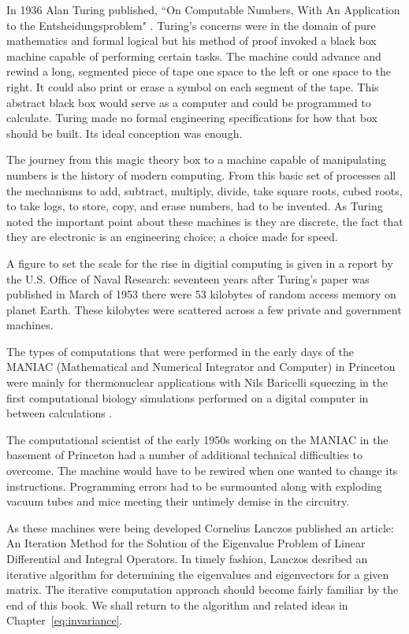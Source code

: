 In 1936 Alan Turing published, ``On Computable Numbers, 
With An Application to the Entsheidungsproblem"
\cite{turing36a}. Turing's concerns were in the domain of pure mathematics and
formal logical but his method of proof invoked a black box machine capable of performing
certain tasks. The machine could advance and rewind a long,
segmented piece of tape one space to the left or one space to the right. 
It could also print or erase a symbol on each segment of the tape.
This abstract black box would serve as a computer and could be programmed 
to calculate. Turing made no formal engineering
specifications for how that box should be built. 
Its ideal conception was enough.

The journey from this magic theory box to a machine capable of manipulating
numbers is the history of modern computing. From this basic set of processes
all the mechanisms to add, subtract, multiply, divide, take square roots, cubed roots, to take logs,
to store, copy, and erase numbers, had to be invented. As Turing noted the important point about
these machines is they are discrete, the fact that they are electronic
is an engineering choice; a choice made for speed.

A figure to set the scale for the rise in digitial computing is given in a report
by the U.S. Office of Naval Research: seventeen years after Turing's paper 
was published in March of 1953 there were 53 kilobytes of 
random access memory on planet Earth.\cite{usonr53}
These kilobytes were scattered across a few private and government machines. 

The types of computations that were performed in the early days of the MANIAC 
(Mathematical and Numerical Integrator and Computer) in Princeton
were mainly for thermonuclear applications with Nils Baricelli 
squeezing in the first computational biology simulations 
performed on a digital computer in between calculations \cite{dyson12, barricelli54, barricelli62}.

The computational scientist of the early 1950s working
on the MANIAC in the basement of Princeton had a number of additional 
technical difficulties to overcome. The machine would have to be rewired when one wanted
to change its instructions. Programming errors had to be surmounted along with exploding
vacuum tubes and mice meeting their untimely demise in the circuitry.

As these machines were being developed Cornelius Lanczos published
an article: An Iteration Method for the Solution of the Eigenvalue Problem of Linear
Differential and Integral Operators\cite{lanczos50}. In timely fashion, Lanczos desribed 
an iterative algorithm for determining the eigenvalues and eigenvectors for a given
matrix. The iterative computation approach should become fairly
familiar by the end of this book. We shall return to the algorithm 
and related ideas in Chapter~\ref{eq:invariance}. 

